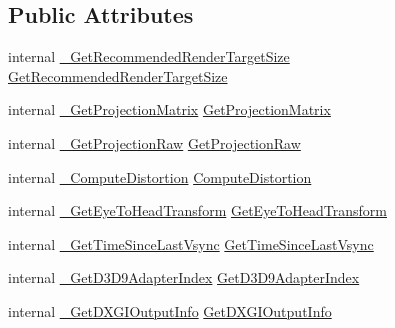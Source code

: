 \subsection*{Public Attributes}
\begin{DoxyCompactItemize}
\item 
internal \mbox{\hyperlink{struct_valve_1_1_v_r_1_1_i_v_r_system_a7c739552eda67112e5ed1c5e6b64388b}{\+\_\+\+Get\+Recommended\+Render\+Target\+Size}} \mbox{\hyperlink{struct_valve_1_1_v_r_1_1_i_v_r_system_a51dc8b71cce5093f779099db3f2ae19c}{Get\+Recommended\+Render\+Target\+Size}}
\item 
internal \mbox{\hyperlink{struct_valve_1_1_v_r_1_1_i_v_r_system_a10aad034ee13b75116d84a989eced445}{\+\_\+\+Get\+Projection\+Matrix}} \mbox{\hyperlink{struct_valve_1_1_v_r_1_1_i_v_r_system_a28ccdb1a7ebc0cd67aa01fde5a09a29e}{Get\+Projection\+Matrix}}
\item 
internal \mbox{\hyperlink{struct_valve_1_1_v_r_1_1_i_v_r_system_adb042a1d95520b0ab26f1f2c97d7dff4}{\+\_\+\+Get\+Projection\+Raw}} \mbox{\hyperlink{struct_valve_1_1_v_r_1_1_i_v_r_system_abc6c8a648793f141ae5cd8498887eb6d}{Get\+Projection\+Raw}}
\item 
internal \mbox{\hyperlink{struct_valve_1_1_v_r_1_1_i_v_r_system_a88600e2b90cd94cb7fd918636a56cef3}{\+\_\+\+Compute\+Distortion}} \mbox{\hyperlink{struct_valve_1_1_v_r_1_1_i_v_r_system_a20be9536f86c1195024062854be1ac59}{Compute\+Distortion}}
\item 
internal \mbox{\hyperlink{struct_valve_1_1_v_r_1_1_i_v_r_system_a285d2953403229712d9fa48bb3224d80}{\+\_\+\+Get\+Eye\+To\+Head\+Transform}} \mbox{\hyperlink{struct_valve_1_1_v_r_1_1_i_v_r_system_a6cf8f7e1b8b9187bf3d4ded098d49203}{Get\+Eye\+To\+Head\+Transform}}
\item 
internal \mbox{\hyperlink{struct_valve_1_1_v_r_1_1_i_v_r_system_ab4843adda277e53c0307051b2ec21cc8}{\+\_\+\+Get\+Time\+Since\+Last\+Vsync}} \mbox{\hyperlink{struct_valve_1_1_v_r_1_1_i_v_r_system_a25109bd3030fde7863c8a1167d2c6bb4}{Get\+Time\+Since\+Last\+Vsync}}
\item 
internal \mbox{\hyperlink{struct_valve_1_1_v_r_1_1_i_v_r_system_af8628eb30b5b12b64585d57ebc093ff9}{\+\_\+\+Get\+D3\+D9\+Adapter\+Index}} \mbox{\hyperlink{struct_valve_1_1_v_r_1_1_i_v_r_system_a1f85e448984efdb948ab539fcf4446c2}{Get\+D3\+D9\+Adapter\+Index}}
\item 
internal \mbox{\hyperlink{struct_valve_1_1_v_r_1_1_i_v_r_system_ab24a286fab0641489f5da8a338858169}{\+\_\+\+Get\+D\+X\+G\+I\+Output\+Info}} \mbox{\hyperlink{struct_valve_1_1_v_r_1_1_i_v_r_system_a433e3147a2f1d989802a8087752bf02c}{Get\+D\+X\+G\+I\+Output\+Info}}

\end{DoxyCompactItemize}
